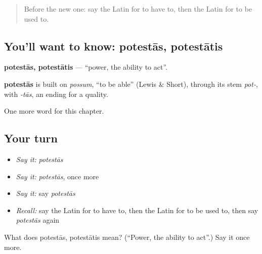 \begin{quote}
Before the new one: say the Latin for to have to, then the Latin for to be used to.
\end{quote}

\subsection*{You'll want to know: potestās, potestātis}
\textbf{potestās, potestātis} — \textquotedblleft{}power, the ability to act\textquotedblright{}.

\begin{cousinweb}
\textbf{potestās} is built on \emph{possum}, \textquotedblleft{}to be able\textquotedblright{} (Lewis \& Short), through its stem \emph{pot-}, with \emph{-tās}, an ending for a quality.
\end{cousinweb}

\begin{grammarlens}[title={What you've built}]
One more word for this chapter.
\end{grammarlens}

\subsection*{Your turn}
\begin{itemize}
\raggedright
  \item \emph{Say it:} \emph{potestās}
  \item \emph{Say it:} \emph{potestās}, once more
  \item \emph{Say it:} say \emph{potestās}
  \item \emph{Recall:} say the Latin for to have to, then the Latin for to be used to, then say \emph{potestās} again
\end{itemize}

\begin{tcolorbox}[breakable,colback=teal!4,colframe=teal!35!black,title={Before you move on}]
What does potestās, potestātis mean? (\textquotedblleft{}Power, the ability to act\textquotedblright{}.) Say it once more.
\end{tcolorbox}
